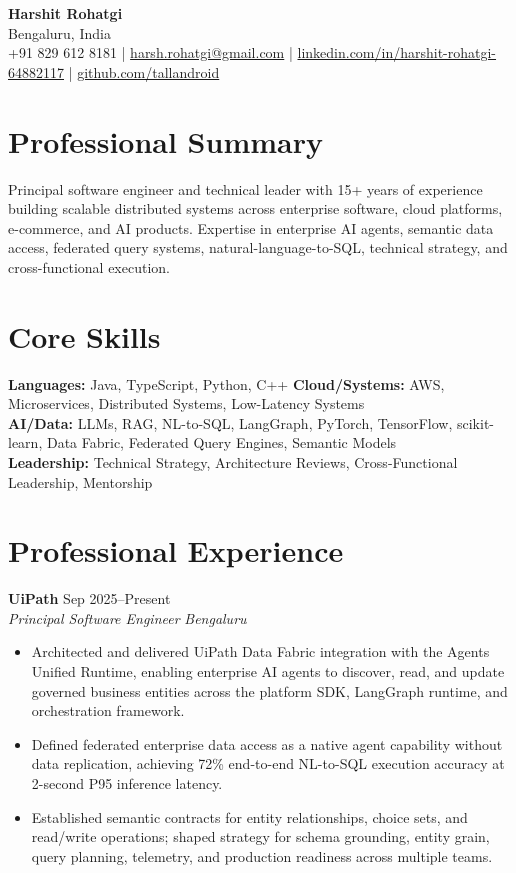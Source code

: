 \documentclass[11pt,a4paper]{article}
\newcommand{\resumeRole}[4]{
  \textbf{#1} \hfill #2\\
  \textit{#3} \hfill \textit{#4}
}
\begin{document}
\begin{center}
    {\LARGE \textbf{Harshit Rohatgi}}\\[4pt]
    Bengaluru, India \\
    +91 829 612 8181 \;|\;
    \href{mailto:harsh.rohatgi@gmail.com}{harsh.rohatgi@gmail.com} \;|\;
    \href{https://www.linkedin.com/in/harshit-rohatgi-64882117}{linkedin.com/in/harshit-rohatgi-64882117} \;|\;
    \href{https://github.com/tallandroid}{github.com/tallandroid}
\end{center}

\section{Professional Summary}

Principal software engineer and technical leader with 15+ years of experience building scalable distributed systems across enterprise software, cloud platforms, e-commerce, and AI products. Expertise in enterprise AI agents, semantic data access, federated query systems, natural-language-to-SQL, technical strategy, and cross-functional execution.

\section{Core Skills}

\textbf{Languages:} Java, TypeScript, Python, C++ \quad
\textbf{Cloud/Systems:} AWS, Microservices, Distributed Systems, Low-Latency Systems\\
\textbf{AI/Data:} LLMs, RAG, NL-to-SQL, LangGraph, PyTorch, TensorFlow, scikit-learn, Data Fabric, Federated Query Engines, Semantic Models\\
\textbf{Leadership:} Technical Strategy, Architecture Reviews, Cross-Functional Leadership, Mentorship

\section{Professional Experience}

\resumeRole{UiPath}{Sep 2025--Present}{Principal Software Engineer}{Bengaluru}
\begin{itemize}
    \item Architected and delivered UiPath Data Fabric integration with the Agents Unified Runtime, enabling enterprise AI agents to discover, read, and update governed business entities across the platform SDK, LangGraph runtime, and orchestration framework.
    \item Defined federated enterprise data access as a native agent capability without data replication, achieving 72\% end-to-end NL-to-SQL execution accuracy at 2-second P95 inference latency.
    \item Established semantic contracts for entity relationships, choice sets, and read/write operations; shaped strategy for schema grounding, entity grain, query planning, telemetry, and production readiness across multiple teams.
\end{itemize}
\end{document}
